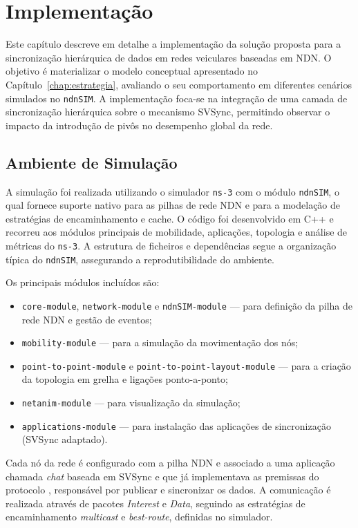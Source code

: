 \chapter{Implementação}

Este capítulo descreve em detalhe a implementação da solução proposta para a sincronização hierárquica de dados em redes veiculares baseadas em \gls{NDN}. O objetivo é materializar o modelo conceptual apresentado no Capítulo~\ref{chap:estrategia}, avaliando o seu comportamento em diferentes cenários simulados no \texttt{ndnSIM}. A implementação foca-se na integração de uma camada de sincronização hierárquica sobre o mecanismo \gls{SVSync}, permitindo observar o impacto da introdução de pivôs no desempenho global da rede.

\section{Ambiente de Simulação}

A simulação foi realizada utilizando o simulador \texttt{ns-3} com o módulo \texttt{ndnSIM}, o qual fornece suporte nativo para as pilhas de rede \gls{NDN} e para a modelação de estratégias de encaminhamento e cache. O código foi desenvolvido em C++ e recorreu aos módulos principais de mobilidade, aplicações, topologia e análise de métricas do \texttt{ns-3}. A estrutura de ficheiros e dependências segue a organização típica do \texttt{ndnSIM}, assegurando a reprodutibilidade do ambiente.

Os principais módulos incluídos são:

\begin{itemize}
    \item \texttt{core-module}, \texttt{network-module} e \texttt{ndnSIM-module} — para definição da pilha de rede \gls{NDN} e gestão de eventos;
    \item \texttt{mobility-module} — para a simulação da movimentação dos nós;
    \item \texttt{point-to-point-module} e \texttt{point-to-point-layout-module} — para a criação da topologia em grelha e ligações ponto-a-ponto;
    \item \texttt{netanim-module} — para visualização da simulação;
    \item \texttt{applications-module} — para instalação das aplicações de sincronização (SVSync adaptado).
\end{itemize}

Cada nó da rede é configurado com a pilha \gls{NDN} \cite{noauthor_named-datandn-svs_2025} e associado a uma aplicação chamada \textit{chat} baseada em SVSync e que já implementava as premissas do protocolo \cite{shsssc_shssscscenario-svs_2023}, responsável por publicar e sincronizar os dados. A comunicação é realizada através de pacotes \textit{Interest} e \textit{Data}, seguindo as estratégias de encaminhamento \textit{multicast} e \textit{best-route}, definidas no simulador.

